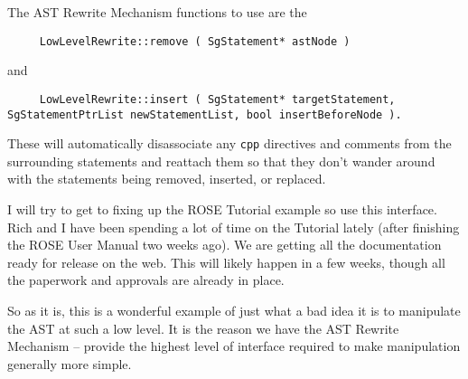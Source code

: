 \begin{enumerate}
The AST Rewrite Mechanism functions to use are the 
{\indent
{\mySmallFontSize
\begin{verbatim}
     LowLevelRewrite::remove ( SgStatement* astNode )
\end{verbatim}
}}
and 
{\indent
{\mySmallFontSize
\begin{verbatim}
     LowLevelRewrite::insert ( SgStatement* targetStatement, SgStatementPtrList newStatementList, bool insertBeforeNode ).
\end{verbatim}
}}

These will automatically disassociate any {\tt cpp} directives and comments
from the surrounding statements and reattach them so that they don't
wander around with the statements being removed, inserted, or replaced.

I will try to get to fixing up the ROSE Tutorial example so use this
interface.  Rich and I have been spending a lot of time on the Tutorial 
lately (after finishing the ROSE User Manual two weeks ago).  We are getting
all the documentation ready for release on the web.  This will likely 
happen in a few weeks, though all the paperwork and approvals are already
in place.

So as it is, this is a wonderful example of just what a bad idea it is
to manipulate the AST at such a low level.
It is the reason we have the AST Rewrite Mechanism -- provide the highest level
of interface required to make manipulation generally more simple.


\end{enumerate}

